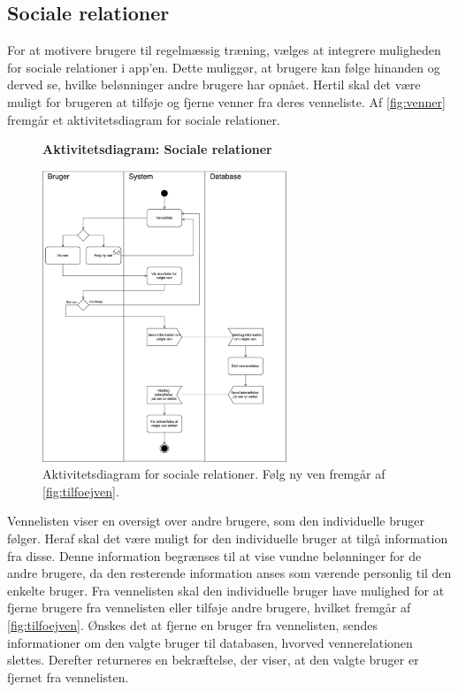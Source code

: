 \subsection*{Sociale relationer} 
For at motivere brugere til regelmæssig træning, vælges at integrere muligheden for sociale relationer i app'en. Dette muliggør, at brugere kan følge hinanden og derved se, hvilke belønninger andre brugere har opnået. Hertil skal det være muligt for brugeren at tilføje og fjerne venner fra deres venneliste. 
Af \autoref{fig:venner} fremgår et aktivitetsdiagram for sociale relationer. 

\begin{figure} [H]
\centering
\textbf{Aktivitetsdiagram: Sociale relationer}\par\medskip
\includegraphics[width=0.65\textwidth]{figures/aktivitetsdiagram/venner}
\caption{Aktivitetsdiagram for sociale relationer. Følg ny ven fremgår af \autoref{fig:tilfoejven}.}
\label{fig:venner}
\end{figure}

\noindent
Vennelisten viser en oversigt over andre brugere, som den individuelle bruger følger. Heraf skal det være muligt for den individuelle bruger at tilgå information fra disse. Denne information begrænses til at vise vundne belønninger for de andre brugere, da den resterende information anses som værende personlig til den enkelte bruger. 
Fra vennelisten skal den individuelle bruger have mulighed for at fjerne brugere fra vennelisten eller tilføje andre brugere, hvilket fremgår af \autoref{fig:tilfoejven}.  
Ønskes det at fjerne en bruger fra vennelisten, sendes informationer om den valgte bruger til databasen, hvorved vennerelationen slettes. Derefter returneres en bekræftelse, der viser, at den valgte bruger er fjernet fra vennelisten. 

